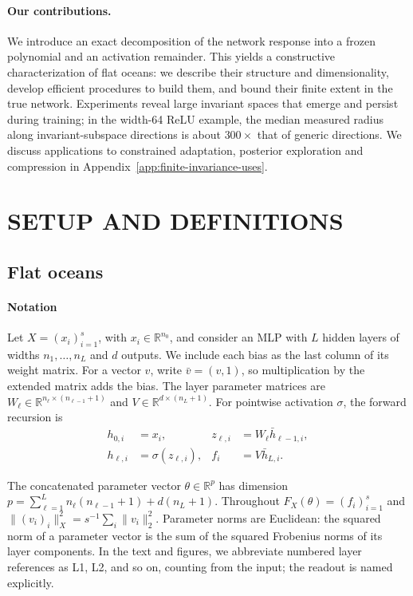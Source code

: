 \documentclass[twoside]{article}
\theoremstyle{remark}
\newcommand{\R}{\mathbb R}
\theoremstyle{highlightdefinition}
\theoremstyle{remark}
\begin{document}
\paragraph{Our contributions.}
We introduce an exact decomposition of the network response into a frozen polynomial and an activation remainder. This yields a constructive characterization of flat oceans: we describe their structure and dimensionality, develop efficient procedures to build them, and bound their finite extent in the true network. Experiments reveal large invariant spaces that emerge and persist during training; in the width-64 ReLU example, the median measured radius along invariant-subspace directions is about \(300\times\) that of generic directions.
We discuss applications to constrained adaptation, posterior exploration and compression in Appendix~\ref{app:finite-invariance-uses}.

\section{SETUP AND DEFINITIONS}
\label{sec:setup}


\subsection{Flat oceans}
\label{sec:oceans-def}
\paragraph{Notation}
Let $X=(x_i)_{i=1}^s$, with $x_i\in\R^{n_0}$, and consider an MLP with $L$ hidden layers of widths $n_1,\ldots,n_L$ and $d$ outputs. We include each bias as the last column of its weight matrix. For a vector $v$, write $\bar v=(v,1)$, so multiplication by the extended matrix adds the bias. 
The layer parameter matrices are $W_\ell\in\R^{n_\ell\times(n_{\ell-1}+1)}$ and $V\in\R^{d\times(n_L+1)}$.
For pointwise activation $\sigma$, the forward recursion is
\begin{align*}
 h_{0,i}&=x_i,&z_{\ell,i}&=W_\ell\bar h_{\ell-1,i},\\
 h_{\ell,i}&=\sigma(z_{\ell,i}),&f_i&=V\bar h_{L,i}.
\end{align*}


The concatenated parameter vector $\theta\in\R^p$ has dimension
$p=\sum_{\ell=1}^L n_\ell(n_{\ell-1}+1)+d(n_L+1)$.
Throughout $F_X(\theta)=(f_i)_{i=1}^s$ and
$\|(v_i)_i\|_X^2=s^{-1}\sum_i\|v_i\|_2^2$.
Parameter norms are Euclidean: the squared norm of a parameter vector is the sum of the squared Frobenius norms of its layer components.
In the text and figures, we abbreviate numbered layer references as L1, L2, and so on, counting from the input; the readout is named explicitly.
\end{document}

